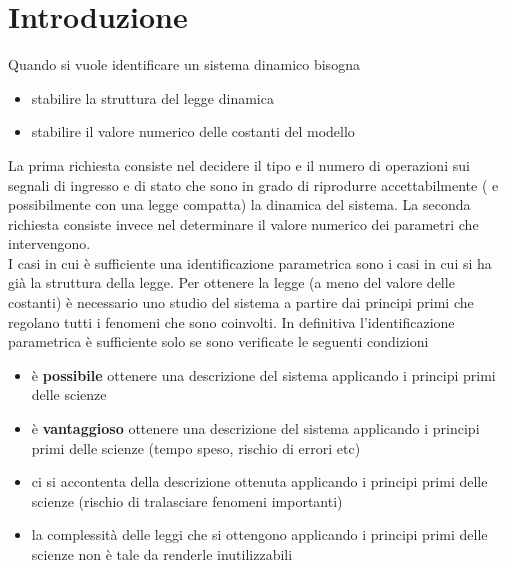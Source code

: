 \documentclass[10pt,a4paper,oneside,openany,noindent]{book}
\begin{document}
\hspace{1em}
\newpage
\chapter{Introduzione}
Quando si vuole identificare un sistema dinamico bisogna
\begin{itemize}
\item stabilire la struttura del legge dinamica
\item stabilire il valore numerico delle costanti del modello
\end{itemize}
La prima richiesta consiste nel decidere il tipo e il numero di operazioni sui segnali di ingresso e di stato che sono in grado di riprodurre accettabilmente ( e possibilmente con una legge compatta) la dinamica del sistema.
La seconda richiesta consiste invece nel determinare il valore numerico dei parametri che intervengono.\\


I casi in cui è sufficiente una identificazione parametrica sono i casi in cui si ha già la struttura della legge. Per ottenere la legge (a meno del valore delle costanti) è necessario uno studio del sistema a partire dai principi primi che regolano tutti i fenomeni che sono coinvolti. In definitiva l'identificazione parametrica è sufficiente solo se sono verificate le seguenti condizioni
\begin{itemize}
\item è \textbf{possibile} ottenere una descrizione del sistema applicando i principi primi delle scienze
\item è \textbf{vantaggioso} ottenere una descrizione del sistema applicando i principi primi delle scienze (tempo speso, rischio di errori etc)
\item ci si accontenta della descrizione ottenuta applicando i principi primi delle scienze (rischio di tralasciare fenomeni importanti)
\item la complessità delle leggi che si ottengono applicando i principi primi delle scienze non è tale da renderle inutilizzabili
\end{itemize}
\end{document}
